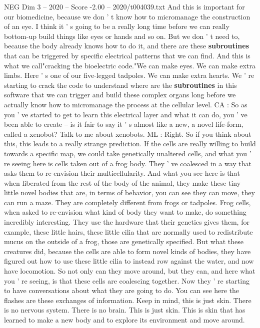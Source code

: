 \begin{textsample}{NEG Dim 3 – 2020 – Score -2.00 – 2020/t004039.txt}
And this is important for our biomedicine, because we don ' t know how to micromanage the construction of an eye.
I think it ' s going to be a really long time before we can really bottom-up build things like eyes or hands and so on.
But we don ' t need to, because the body already knows how to do it, and there are these \textbf{subroutines} that can be triggered by specific electrical patterns that we can find.
And this is what we call"cracking the bioelectric code."We can make eyes.
We can make extra limbs.
Here ' s one of our five-legged tadpoles.
We can make extra hearts.
We ' re starting to crack the code to understand where are the \textbf{subroutines} in this software that we can trigger and build these complex organs long before we actually know how to micromanage the process at the cellular level.
CA : So as you ' ve started to get to learn this electrical layer and what it can do, you ' ve been able to create -- is it fair to say it ' s almost like a new, a novel life-form, called a xenobot?
Talk to me about xenobots.
ML : Right.
So if you think about this, this leads to a really strange prediction.
If the cells are really willing to build towards a specific map, we could take genetically unaltered cells, and what you ' re seeing here is cells taken out of a frog body.
They ' ve coalesced in a way that asks them to re-envision their multicellularity.
And what you see here is that when liberated from the rest of the body of the animal, they make these tiny little novel bodies that are, in terms of behavior, you can see they can move, they can run a maze.
They are completely different from frogs or tadpoles.
Frog cells, when asked to re-envision what kind of body they want to make, do something incredibly interesting.
They use the hardware that their genetics gives them, for example, these little hairs, these little cilia that are normally used to redistribute mucus on the outside of a frog, those are genetically specified.
But what these creatures did, because the cells are able to form novel kinds of bodies, they have figured out how to use these little cilia to instead row against the water, and now have locomotion.
So not only can they move around, but they can, and here what you ' re seeing, is that these cells are coalescing together.
Now they ' re starting to have conversations about what they are going to do.
You can see here the flashes are these exchanges of information.
Keep in mind, this is just skin.
There is no nervous system.
There is no brain.
This is just skin.
This is skin that has learned to make a new body and to explore its environment and move around.

\end{textsample}
